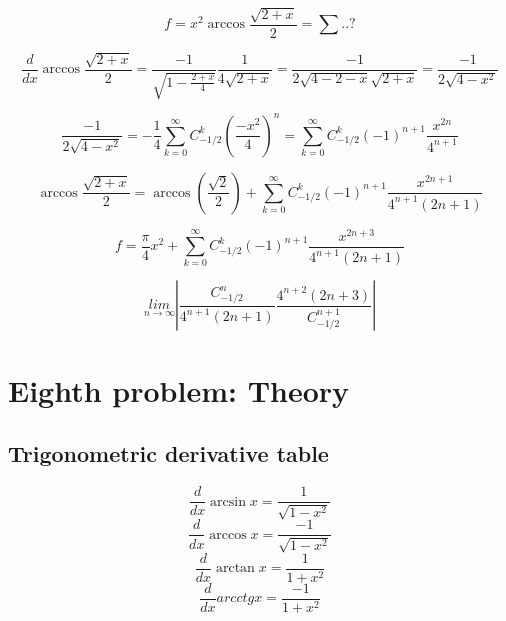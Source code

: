\documentclass{article}
\begin{document}
\begin{equation}
    f = x^2 \arccos \frac{\sqrt{2+x}}{2} = \sum ..?
\end{equation}

\begin{equation*}
    \frac{d}{dx} \arccos \frac{\sqrt{2+x}}{2} = \frac{-1}{\sqrt{1-\frac{2+x}{4}}} \frac{1}{4\sqrt{2+x}} = \frac{-1}{2\sqrt{4-2-x}\sqrt{2+x}} = \frac{-1}{2\sqrt{4-x^2}}
\end{equation*}

\begin{equation*}
    \frac{-1}{2\sqrt{4-x^2}} = -\frac{1}{4}\sum_{k=0}^{\infty} C_{-1/2}^{k} (\frac{-x^2}{4})^{n} = \sum_{k=0}^{\infty} C_{-1/2}^{k} (-1)^{n+1} \frac{x^{2n}}{4^{n+1}}
\end{equation*}

\begin{equation*}
    \arccos \frac{\sqrt{2+x}}{2} = \arccos (\frac{\sqrt{2}}{2}) + \sum_{k=0}^{\infty} C_{-1/2}^{k} (-1)^{n+1} \frac{x^{2n+1}}{4^{n+1} (2n+1)}
\end{equation*}

\begin{equation*}
    f = \frac{\pi}{4} x^2 + \sum_{k=0}^{\infty} C_{-1/2}^{k} (-1)^{n+1} \frac{x^{2n+3}}{4^{n+1} (2n+1)}
\end{equation*}

\begin{equation*}
    \underset{n \rightarrow \infty}{lim} | \frac{C_{-1/2}^{n}}{4^{n+1}(2n+1)} \frac{4^{n+2}(2n+3)}{C_{-1/2}^{n+1}}|
\end{equation*}

\newpage
\section{Eighth problem: Theory}

\hypertarget{8.1}{}
\subsection{Trigonometric derivative table}
\begin{equation*}
    \frac{d}{dx}\arcsin x = \frac{1}{\sqrt{1-x^2}}
\end{equation*}
\begin{equation*}
    \frac{d}{dx}\arccos x = \frac{-1}{\sqrt{1-x^2}}
\end{equation*}
\begin{equation*}
    \frac{d}{dx} \arctan x = \frac{1}{1+x^2}
\end{equation*}
\begin{equation*}
    \frac{d}{dx} arcctg x = \frac{-1}{1+x^2}
\end{equation*}
\end{document}

